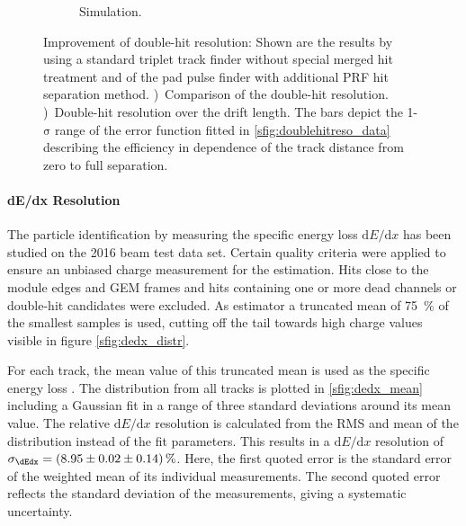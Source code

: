 \begin{figure}[tbhp!]
\begin{subfigure}[b]{0.5\textwidth}
\caption{Simulation.}
\label{sfig:DHR_vs_drift_data}
\end{subfigure}
\caption{\small Improvement of double-hit resolution: Shown are the results by using a standard triplet track finder without special merged hit treatment and of the pad pulse finder with additional PRF hit separation method. 
\protect{})~Comparison of the double-hit resolution.
\protect{})~Double-hit resolution over the drift length. The bars depict the 1-$\mathrm{\sigma}$ range of the error function fitted in \protect\ref{sfig:doublehitreso_data} describing the efficiency in dependence of the track distance from zero to full separation.
}
\label{fig:doublehitreso}
\end{figure}

\paragraph{dE/dx Resolution}

The particle identification by measuring the specific energy loss \ensuremath{\mathrm{d}E/\mathrm{d}x} has been studied on the 2016 beam test data set. 
Certain quality criteria were applied to ensure an unbiased charge measurement for the \dEdx estimation.
Hits close to the module edges and GEM frames and hits containing one or more dead channels or double-hit candidates were excluded.
As estimator a truncated mean of \SI{75}{\percent} of the smallest samples is used, cutting off the tail towards high charge values visible in figure \ref{sfig:dedx_distr}.

For each track, the mean value of this truncated mean is used as the specific energy loss \dEdx.
The distribution from all tracks is plotted in \ref{sfig:dedx_mean} including a Gaussian fit in a range of three standard deviations around its mean value.
The relative \ensuremath{\mathrm{d}E/\mathrm{d}x} resolution is calculated from the RMS and mean of the distribution instead of the fit parameters.
This results in a \ensuremath{\mathrm{d}E/\mathrm{d}x} resolution of $\sigma_{\dEdx} = \SI[parse-numbers=false]{(8.95\pm0.02\pm0.14)}{\percent}$. 
Here, the first quoted error is the standard error of the weighted mean of its individual measurements.
The second quoted error reflects the standard deviation of the measurements, giving a systematic uncertainty.

